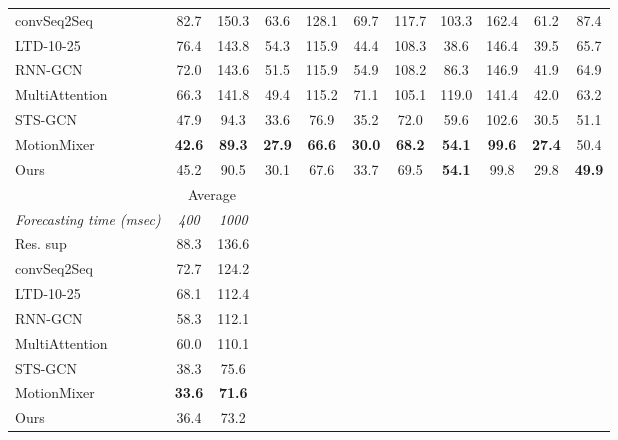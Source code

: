 \begin{table}
{\begin{tabular}{|l|cc|cc|cc|cc|cc|}
            convSeq2Seq~\cite{Li_2018} & 82.7 & 150.3 & 63.6 & 128.1 & 69.7 & 117.7 & 103.3 & 162.4 & 61.2 & 87.4 \\

            LTD-10-25~\cite{Mao2019} & 76.4 & 143.8 & 54.3 & 115.9 & 44.4 & 108.3 & 38.6 & 146.4 & 39.5 & 65.7 \\

            RNN-GCN~\cite{Mao2020} & 72.0 & 143.6 & 51.5 & 115.9 & 54.9 & 108.2 & 86.3 & 146.9 & 41.9 & 64.9 \\

            MultiAttention~\cite{mao2021multi} & 66.3 & 141.8 & 49.4 & 115.2 & 71.1 & 105.1 & 119.0 & 141.4 & 42.0 & 63.2 \\
        
            STS-GCN~\cite{Sofianos2021} & 47.9 & 94.3 & 33.6 & 76.9 & 35.2 & 72.0 & 59.6 & 102.6 & 30.5 & 51.1 \\

            MotionMixer~\cite{motionmixer2022}  & \textbf{42.6} & \textbf{89.3} & \textbf{27.9} & \textbf{66.6}  & \textbf{30.0} & \textbf{68.2} & \textbf{54.1} & \textbf{99.6}  & \textbf{27.4} & 50.4 \\
            \hline
            Ours & 45.2 & 90.5 & 30.1 & 67.6  & 33.7 & 69.5 & \textbf{54.1} & 99.8 & 29.8 & \textbf{49.9 }\\
            
        \midrule
        
         & \multicolumn{2}{c|}{Average} \\
             
           \textit{Forecasting time (msec)}  & \textit{400} & \textit{1000} \\
            \cline{1-3}
            Res. sup~\cite{martinez2017}  & 88.3 & 136.6 \\ 
            convSeq2Seq~\cite{Li_2018}  & 72.7 & 124.2 \\
            LTD-10-25~\cite{Mao2019}  & 68.1 & 112.4 \\
            RNN-GCN~\cite{Mao2020}  & 58.3 & 112.1 \\
            MultiAttention~\cite{mao2021multi} & 60.0 & 110.1 \\
            STS-GCN~\cite{Sofianos2021} & 38.3 & 75.6  \\ 
            MotionMixer~\cite{motionmixer2022}  & \textbf{33.6 }& \textbf{71.6}  \\ 
            \cline{1-3}
            Ours~\cite{motionmixer2022}  & 36.4 & 73.2  \\ 
            \cline{1-3}
    
        \end{tabular}}    
    \label{tbl:3D_MPJPE}
\end{table}

